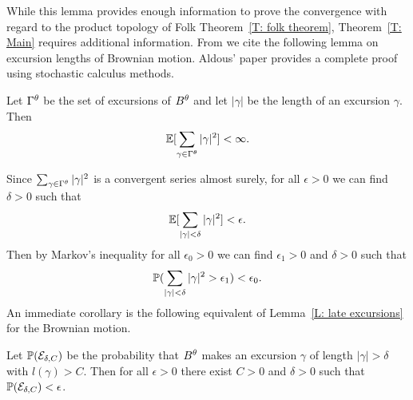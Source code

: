 While this lemma provides enough information to prove the convergence with regard to the product topology of Folk Theorem~\ref{T: folk theorem},
Theorem~\ref{T: Main} requires additional information.
From \cite[Lemma 25, p.843]{Aldous.1997} we cite the following lemma on excursion lengths of Brownian motion.
Aldous' paper provides a complete proof using stochastic calculus methods.
\begin{lemma} \label{L: BM in ld}
	Let $\Gamma^{\theta}$ be the set of excursions of $B^{\theta}$ and let $|\gamma|$ be the length of an excursion $\gamma$.
	Then
	\begin{equation}
		\mathbb{E}[\sum_{\gamma \in \Gamma^{\theta}} |\gamma|^2] < \infty.
	\end{equation}
\end{lemma}

Since $\sum_{\gamma \in \Gamma^{\theta}} |\gamma|^2$ is a convergent series almost surely,
for all $\epsilon > 0$ we can find $\delta > 0$ such that
\begin{equation}
	\mathbb{E}[\sum_{|\gamma| < \delta} |\gamma|^2] < \epsilon.
\end{equation}
Then by Markov's inequality for all $\epsilon_0 > 0$ we can find $\epsilon_1 > 0$ and $\delta > 0$ such that
\begin{equation} \label{E: sum gamma < delta}
	\mathbb{P}(\sum_{|\gamma| < \delta} |\gamma|^2 > \epsilon_1) < \epsilon_0.
\end{equation}
An immediate corollary is the following equivalent of Lemma~\ref{L: late excursions} for the Brownian motion.

\begin{lemma} \label{L: late excursions gamma}
	Let $\mathbb{P}(\mathcal{E}_{\delta, C})$ be the probability that $B^{\theta}$ makes an excursion $\gamma$ 
	of length $|\gamma| > \delta$ with $l(\gamma) > C$.
	Then for all $\epsilon > 0$ there exist $C > 0$ and $\delta > 0$ such that $\mathbb{P}(\mathcal{E}_{\delta, C}) < \epsilon$.
\end{lemma}	

